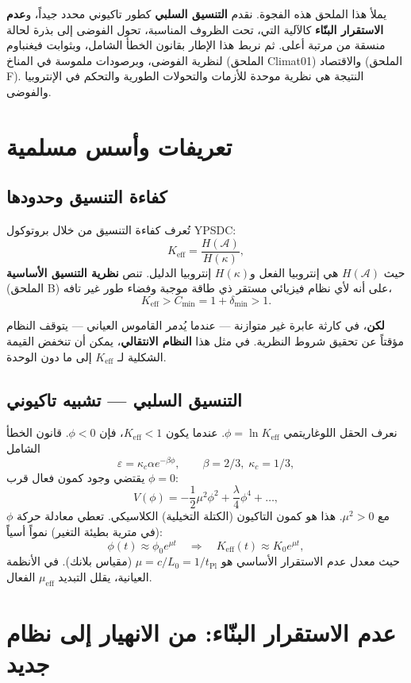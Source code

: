 \documentclass[12pt,a4paper]{article}
\newcommand{\Keff}{K_{\mathrm{eff}}}
\begin{document}
	يملأ هذا الملحق هذه الفجوة. نقدم \textbf{التنسيق السلبي} كطور تاكيوني محدد جيداً، و\textbf{عدم الاستقرار البنّاء} كالآلية التي، تحت الظروف المناسبة، تحول الفوضى إلى بذرة لحالة منسقة من مرتبة أعلى. ثم نربط هذا الإطار بقانون الخطأ الشامل، وبثوابت فيغنباوم لنظرية الفوضى، وبرصودات ملموسة في المناخ (الملحق Climat01) والاقتصاد (الملحق F). النتيجة هي نظرية موحدة للأزمات والتحولات الطورية والتحكم في الإنتروبيا والفوضى.
	
	\section{تعريفات وأسس مسلمية}
	\subsection{كفاءة التنسيق وحدودها}
	تُعرف كفاءة التنسيق من خلال بروتوكول YPSDC:
	\[
	\Keff = \frac{H(\mathcal{A})}{H(\kappa)},
	\]
	حيث \(H(\mathcal{A})\) هي إنتروبيا الفعل و\(H(\kappa)\) إنتروبيا الدليل. تنص \textbf{نظرية التنسيق الأساسية} (الملحق B) على أنه لأي نظام فيزيائي مستقر ذي طاقة موجبة وفضاء طور غير تافه،
	\[
	\Keff > C_{\min} = 1 + \delta_{\min} > 1.
	\]
	
	\textbf{لكن}، في كارثة عابرة غير متوازنة — عندما يُدمر القاموس العياني — يتوقف النظام مؤقتاً عن تحقيق شروط النظرية. في مثل هذا \textbf{النظام الانتقالي}، يمكن أن تنخفض القيمة الشكلية لـ \(\Keff\) إلى ما دون الوحدة.
	
	\subsection{التنسيق السلبي — تشبيه تاكيوني}
	نعرف الحقل اللوغاريتمي \(\phi = \ln \Keff\). عندما يكون \(\Keff < 1\)، فإن \(\phi < 0\). قانون الخطأ الشامل
	\[
	\varepsilon = \kappa_c \alpha e^{-\beta \phi}, \qquad \beta = 2/3,\; \kappa_c = 1/3,
	\]
	يقتضي وجود كمون فعال قرب \(\phi = 0\):
	\[
	V(\phi) = -\frac{1}{2}\mu^2 \phi^2 + \frac{\lambda}{4}\phi^4 + \dots,
	\]
	مع \(\mu^2 > 0\). هذا هو كمون التاكيون (الكتلة التخيلية) الكلاسيكي. تعطي معادلة حركة \(\phi\) (في مترية بطيئة التغير) نمواً أسياً:
	\[
	\phi(t) \approx \phi_0 e^{\mu t} \quad\Longrightarrow\quad \Keff(t) \approx K_0 e^{\mu t},
	\]
	حيث معدل عدم الاستقرار الأساسي هو \(\mu = c/L_0 = 1/t_{\mathrm{Pl}}\) (مقياس بلانك). في الأنظمة العيانية، يقلل التبديد \(\mu_{\mathrm{eff}}\) الفعال.
	
	\section{عدم الاستقرار البنّاء: من الانهيار إلى نظام جديد}
\end{document}
